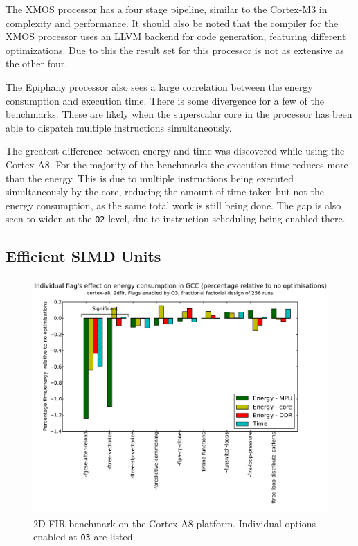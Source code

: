 \documentclass[twocolumn]{article}
\let\oldcaption\caption
\renewcommand{\caption}[1]{\oldcaption{\textup{#1}}}
\begin{document}
The XMOS processor has a four stage pipeline, similar to the Cortex-M3 in complexity and performance. It should also be noted that the compiler for the XMOS processor uses an LLVM backend for code generation, featuring different optimizations. Due to this the result set for this processor is not as extensive as the other four.


The Epiphany processor also sees a large correlation between the energy consumption and execution time. There is some divergence for a few of the benchmarks. These are likely when the superscalar core in the processor has been able to dispatch multiple instructions simultaneously.

The greatest difference between energy and time was discovered while using the Cortex-A8. For the majority of the benchmarks the execution time reduces more than the energy. This is due to multiple instructions being executed simultaneously by the core, reducing the amount of time taken but not the energy consumption, as the same total work is still being done. The gap is also seen to widen at the \texttt{O2} level, due to instruction scheduling being enabled there.


\subsection{Efficient SIMD Units}

\begin{figure}[t!]
	\includegraphics[width=\linewidth,clip,trim=0.5cm 0 2cm 1.8cm]{cortex-a8/O3_main_effects_2dfir.pdf}
	\caption{2D FIR benchmark on the Cortex-A8 platform. Individual options enabled at \texttt{O3} are listed.}
	\label{Fig:O3_2dfir_A8}
\end{figure}
\end{document}
